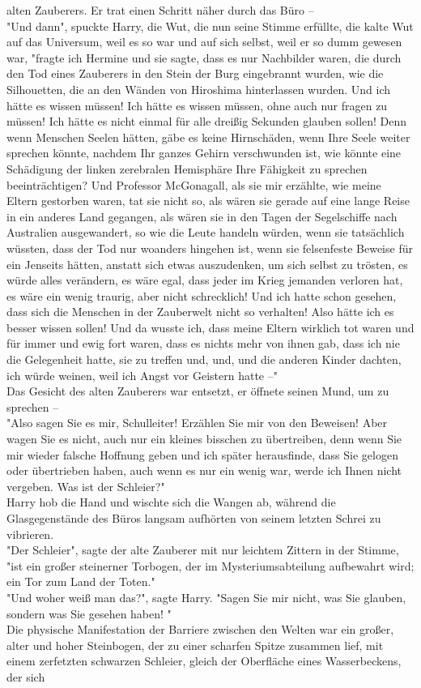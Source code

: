 {alten Zauberers. Er trat einen Schritt näher durch das Büro --\\ "Und dann", spuckte Harry, die Wut, die nun seine Stimme erfüllte, die kalte Wut auf das Universum, weil es so war und auf sich selbst, weil er so dumm gewesen war, "fragte ich Hermine und sie sagte, dass es nur Nachbilder waren, die durch den Tod eines Zauberers in den Stein der Burg eingebrannt wurden, wie die Silhouetten, die an den Wänden von Hiroshima hinterlassen wurden. Und ich hätte es wissen müssen! Ich hätte es wissen müssen, ohne auch nur fragen zu müssen! Ich hätte es nicht einmal für alle dreißig Sekunden glauben sollen! Denn wenn Menschen Seelen hätten, gäbe es keine Hirnschäden, wenn Ihre Seele weiter sprechen könnte, nachdem Ihr ganzes Gehirn verschwunden ist, wie könnte eine Schädigung der linken zerebralen Hemisphäre Ihre Fähigkeit zu sprechen beeinträchtigen? Und Professor McGonagall, als sie mir erzählte, wie meine Eltern gestorben waren, tat sie nicht so, als wären sie gerade auf eine lange Reise in ein anderes Land gegangen, als wären sie in den Tagen der Segelschiffe nach Australien ausgewandert, so wie die Leute handeln würden, wenn sie tatsächlich wüssten, dass der Tod nur woanders hingehen ist, wenn sie felsenfeste Beweise für ein Jenseits hätten, anstatt sich etwas auszudenken, um sich selbst zu trösten, es würde alles verändern, es wäre egal, dass jeder im Krieg jemanden verloren hat, es wäre ein wenig traurig, aber nicht schrecklich! Und ich hatte schon gesehen, dass sich die Menschen in der Zauberwelt nicht so verhalten! Also hätte ich es besser wissen sollen! Und da wusste ich, dass meine Eltern wirklich tot waren und für immer und ewig fort waren, dass es nichts mehr von ihnen gab, dass ich nie die Gelegenheit hatte, sie zu treffen und, und, und die anderen Kinder dachten, ich würde weinen, weil ich Angst vor Geistern hatte --"\\ Das Gesicht des alten Zauberers war entsetzt, er öffnete seinen Mund, um zu sprechen --\\ "Also sagen Sie es mir, Schulleiter! Erzählen Sie mir von den Beweisen! Aber wagen Sie es nicht, auch nur ein kleines bisschen zu übertreiben, denn wenn Sie mir wieder falsche Hoffnung geben und ich später herausfinde, dass Sie gelogen oder übertrieben haben, auch wenn es nur ein wenig war, werde ich Ihnen nicht vergeben. Was ist der Schleier?"\\ Harry hob die Hand und wischte sich die Wangen ab, während die Glasgegenstände des Büros langsam aufhörten von seinem letzten Schrei zu vibrieren.\\ "Der Schleier", sagte der alte Zauberer mit nur leichtem Zittern in der Stimme, "ist ein großer steinerner Torbogen, der im Mysteriumsabteilung aufbewahrt wird; ein Tor zum Land der Toten."\\ "Und woher weiß man das?", sagte Harry. "Sagen Sie mir nicht, was Sie glauben, sondern was Sie gesehen haben! "\\ Die physische Manifestation der Barriere zwischen den Welten war ein großer, alter und hoher Steinbogen, der zu einer scharfen Spitze zusammen lief, mit einem zerfetzten schwarzen Schleier, gleich der Oberfläche eines Wasserbeckens, der sich }
